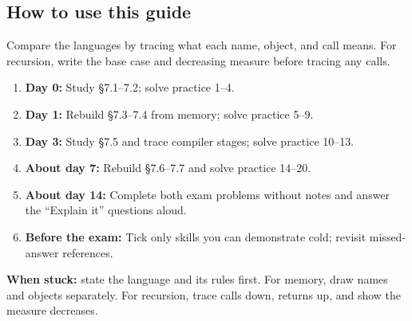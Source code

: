\documentclass[11pt]{article}
\begin{document}
\begin{keepsection}
\section{How to use this guide}

Compare the languages by tracing what each name, object, and call means. For recursion, write the base case and decreasing measure before tracing any calls.

\begin{enumerate}
\item \textbf{Day 0:} Study §7.1–7.2; solve practice 1–4.
\item \textbf{Day 1:} Rebuild §7.3–7.4 from memory; solve practice 5–9.
\item \textbf{Day 3:} Study §7.5 and trace compiler stages; solve practice 10–13.
\item \textbf{About day 7:} Rebuild §7.6–7.7 and solve practice 14–20.
\item \textbf{About day 14:} Complete both exam problems without notes and answer the “Explain it” questions aloud.
\item \textbf{Before the exam:} Tick only skills you can demonstrate cold; revisit missed-answer references.
\end{enumerate}

\begin{notebox}\textbf{When stuck:} state the language and its rules first. For memory, draw names and objects separately. For recursion, trace calls down, returns up, and show the measure decreases.\end{notebox}
\end{keepsection}
\end{document}
